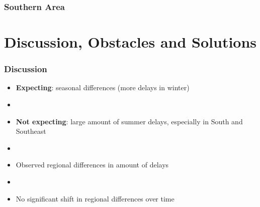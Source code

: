 \documentclass{beamer}
\begin{document}
\begin{frame}
\frametitle{Southern Area}
\begin{center}
\end{center}
\end{frame}





















\section{Discussion, Obstacles and Solutions}
\begin{frame}
\frametitle{Discussion}

\begin{itemize}
\item \textbf{Expecting}: seasonal differences (more delays in winter)

\item[]

\item \textbf{Not expecting}: large amount of summer delays, especially in South and Southeast

\item[]

\item Observed regional differences in amount of delays

\item[]

\item No significant shift in regional differences over time

\end{itemize}
\end{frame}
\end{document}
